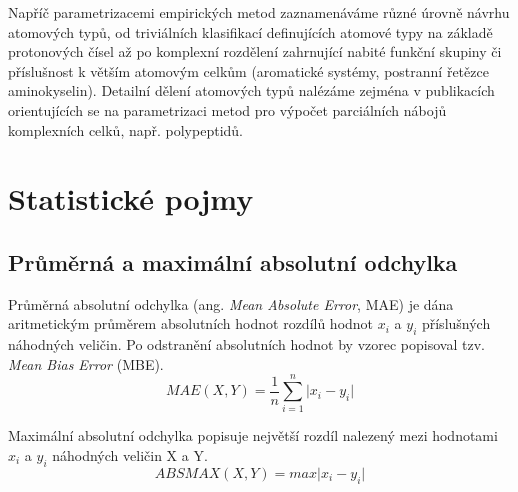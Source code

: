 Napříč parametrizacemi empirických metod zaznamenáváme různé úrovně návrhu atomových typů, od triviálních klasifikací definujících atomové typy na základě protonových čísel až po komplexní rozdělení zahrnující nabité funkční skupiny či příslušnost k větším atomovým celkům (aromatické systémy, postranní řetězce aminokyselin). Detailní dělení atomových typů nalézáme zejména v publikacích orientujících se na parametrizaci metod pro výpočet parciálních nábojů komplexních celků, např. polypeptidů.

\section{Statistické pojmy}
\subsection{Průměrná a maximální absolutní odchylka}
Průměrná absolutní odchylka (ang. \textit{Mean Absolute Error}, MAE) je dána aritmetickým průměrem absolutních hodnot rozdílů hodnot $x_i$ a $y_i$ příslušných náhodných veličin. Po odstranění absolutních hodnot by vzorec popisoval tzv. \textit{Mean Bias Error} (MBE). 
\begin{equation}
\label{}
    MAE(X,Y) = \frac{1}{n} \sum_{i=1}^n \lvert x_i - y_i \rvert
\end{equation}

Maximální absolutní odchylka popisuje největší rozdíl nalezený mezi hodnotami $x_i$ a $y_i$ náhodných veličin X a Y.
\begin{equation}
    ABSMAX(X,Y) = max \lvert x_i - y_i \rvert
\end{equation}


